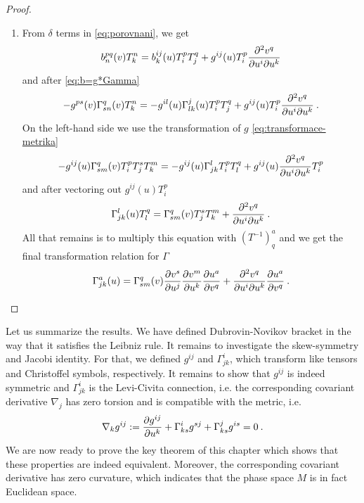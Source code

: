 \begin{proof}
\begin{enumerate}
        \item From $\delta$ terms in \eqref{eq:porovnani}, we get
        \begin{align}
            b^{pq}_n(v) T^n_k =
            b^{ij}_k(u) T^p_i T^q_j + g^{ij}(u) T^p_i \frac{\partial^2 v^q}{\partial u^i \partial u^k}
        \end{align}
        and after \eqref{eq:b=g*Gamma}
        \begin{align}
            - g^{ps}(v) \Gamma^{q}_{sn}(v) T^n_k =
            - g^{il}(u) \Gamma^j_{lk}(u) T^p_i T^q_j + g^{ij}(u) T^p_i \frac{\partial^2 v^q}{\partial u^i \partial u^k} \:.
        \end{align}
        On the left-hand side we use the transformation of $g$ \eqref{eq:transformace-metrika}
        \begin{align}
            -g^{ij}(u) \Gamma^q_{sm}(v) T^p_i T^s_j T^m_k = - g^{ij}(u) \Gamma^l_{jk} T^p_i T^q_l + g^{ij}(u) \frac{\partial^2 v^q}{\partial u^i \partial u^k} T^p_i 
        \end{align}
        and after vectoring out $g^{ij}(u) T^p_i$
        \begin{align}
            \Gamma^l_{jk}(u) T^q_l = \Gamma^q_{sm}(v) T^s_j T^m_k + \frac{\partial^2 v^q}{\partial u^i \partial u^k} \:.
        \end{align}
        All that remains is to multiply this equation with $(T^{-1})^a_q$ and we get the final transformation relation for $\Gamma$
        \begin{align}
            \Gamma^a_{jk}(u) = \Gamma^q_{sm}(v) \frac{\partial v^s}{\partial u^j} \frac{\partial v^m}{\partial u^k} \frac{\partial u^a}{\partial v^q} + \frac{\partial^2 v^q}{\partial u^i \partial u^k} \frac{\partial u^a}{\partial v^q} \:.
        \end{align}
    \end{enumerate}
\end{proof}

Let us summarize the results. We have defined Dubrovin-Novikov bracket in the way that it satisfies the Leibniz rule. It remains to investigate the skew-symmetry and Jacobi identity. For that, we defined $g^{ij}$ and $\Gamma^i_{jk}$, which transform like tensors and Christoffel symbols, respectively. It remains to show that $g^{ij}$ is indeed symmetric and $\Gamma^i_{jk}$ is the Levi-Civita connection, i.e. the corresponding covariant derivative $\nabla_j$ has zero torsion and is compatible with the metric, i.e.
\begin{align}
    \nabla_k g^{ij} := \frac{\partial g^{ij}}{\partial u^k} + \Gamma^{i}_{ks} g^{sj} + \Gamma^{j}_{ks} g^{is} = 0\:.
\end{align}
We are now ready to prove the key theorem of this chapter which shows that these properties are indeed equivalent. Moreover, the corresponding covariant derivative has zero curvature, which indicates that the phase space $M$ is in fact Euclidean space.

